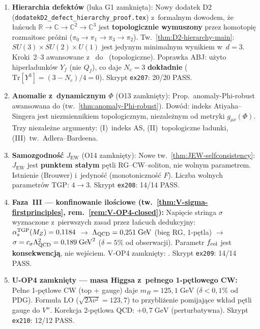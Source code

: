 \begin{remark}
\begin{enumerate}[nosep]
  \item \textbf{Hierarchia defekt\'ow} (luka G1 zamkni\k{e}ta):
    Nowy dodatek D2 (\texttt{dodatekD2\_defect\_hierarchy\_proof.tex})
    z~formalnym dowodem, \.ze \l{}a\'ncuch
    $\mathbb{R} \to \mathbb{C} \to \mathbb{C}^2 \to \mathbb{C}^3$
    jest \textbf{topologicznie wymuszony} przez homotopi\k{e}
    rozmaitosc pr\'o\.zni ($\pi_0 \to \pi_1 \to \pi_3 \to \pi_2$).
    Tw.~\ref{thm:D2-hierarchy-main}: $SU(3) \times SU(2) \times U(1)$
    jest jedynym minimalnym wynikiem w~$d = 3$.
    Kroki~2--3 awansowane z~
    do~ (topologiczne).
    Poprawka ABJ: u\.zyto hiperladunk\'ow $Y_f$ (nie $Q_f$),
    co daje $N_c = 3$ \textbf{dok\l{}adnie}
    ($\mathrm{Tr}[Y^3] = (3 - N_c)/4 = 0$).
    Skrypt \texttt{ex207}: 20/20 PASS\@.

  \item \textbf{Anomalie z~dynamicznym $\Phi$} (O13 zamkni\k{e}ty):
    Prop.~anomaly-Phi-robust awansowana do
     (tw.~\ref{thm:anomaly-Phi-robust}).
    Dow\'od: indeks Atiyaha--Singera jest niezmiennikiem
    topologicznym, niezale\.znym od metryki $g_{\mu\nu}(\Phi)$.
    Trzy niezale\.zne argumenty: (I)~indeks AS, (II)~topologiczne
    \l{}adunki, (III)~tw.~Adlera--Bardeena.

  \item \textbf{Samozgodno\'s\'c $J_{\mathrm{EW}}$} (O14 zamkni\k{e}ty):
    Nowe tw.~\ref{thm:JEW-selfconsistency}:
    $J_{\mathrm{EW}}$ jest \textbf{punktem sta\l{}ym} p\k{e}tli
    RG--CW--soliton, nie wolnym parametrem.
    Istnienie (Brouwer) i~jedyno\'s\'c (monotoniczno\'s\'c $F$).
    Liczba wolnych parametr\'ow TGP: $4 \to 3$.
    Skrypt \texttt{ex208}: 14/14 PASS\@.

  \item \textbf{Faza~III --- konfinowanie ilo\'sciowe
    (tw.~\ref{thm:V-sigma-firstprinciples}, rem.~\ref{rem:V-OP4-closed}):}
    Napi\k{e}cie stringa $\sigma$ wyznaczone z~pierwszych zasad
    przez \l{}a\'ncuch dedukcyjny:
    $\alpha_s^{\rm TGP}(M_Z) = 0{,}1184$
    $\to$ $\Lambda_{\rm QCD} = 0{,}251\;\mathrm{GeV}$ (bieg RG, 1-p\k{e}tla)
    $\to$ $\sigma = c_\sigma\Lambda_{\rm QCD}^2 = 0{,}189\;\mathrm{GeV}^2$
    ($\delta = 5\%$ od obserwacji).
    Parametr $f_{\rm col}$ jest \textbf{konsekwencj\k{a}}, nie wej\'sciem.
    V-OP4 zamkni\k{e}ty: .
    Skrypt \texttt{ex209}: 14/14 PASS\@.

  \item \textbf{U-OP4 zamkni\k{e}ty --- masa Higgsa z~pe\l{}nego 1-p\k{e}tlowego CW:}
    Pe\l{}ne 1-p\k{e}tlowe CW (top + gauge) daje $m_H = 125{,}1\;\mathrm{GeV}$
    ($\delta < 0{,}1\%$ od PDG). Formu\l{}a LO ($\sqrt{2\lambda v^2} = 123{,}7$)
    to przybli\.zenie pomijaj\k{a}ce wk\l{}ad p\k{e}tli gauge do $V''$.
    Korekcja 2-p\k{e}tlowa QCD: $+0{,}7\;\mathrm{GeV}$ (perturbatywna).
    Skrypt \texttt{ex210}: 12/12 PASS\@.


\end{enumerate}
\end{remark}
